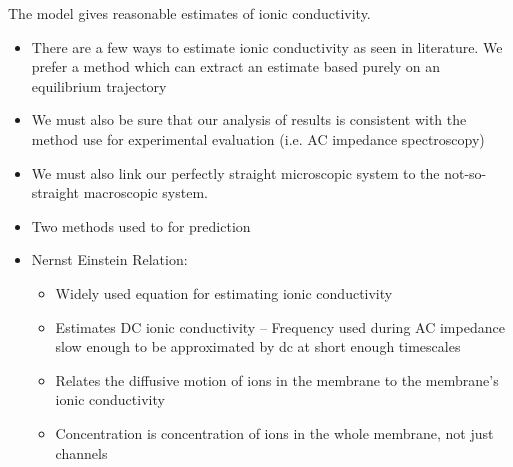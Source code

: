 \documentclass{article}
\begin{document}
	The model gives reasonable estimates of ionic conductivity.
	\begin{itemize}
		\item There are a few ways to estimate ionic conductivity as seen in literature. We prefer a method which can extract an estimate based purely on an equilibrium trajectory
		\item We must also be sure that our analysis of results is consistent with the method use for experimental evaluation (i.e. AC impedance spectroscopy)
		\item We must also link our perfectly straight microscopic system to the not-so-straight macroscopic system. %
		\item Two methods used to for prediction
		\item Nernst Einstein Relation:
		\begin{itemize}
			\item Widely used equation for estimating ionic conductivity
			\item Estimates DC ionic conductivity -- Frequency used during AC impedance slow enough to be approximated by dc at short enough timescales
			\item Relates the diffusive motion of ions in the membrane to the membrane's ionic conductivity
			\item Concentration is concentration of ions in the whole membrane, not just channels

\end{itemize}
\end{itemize}
\end{document}
